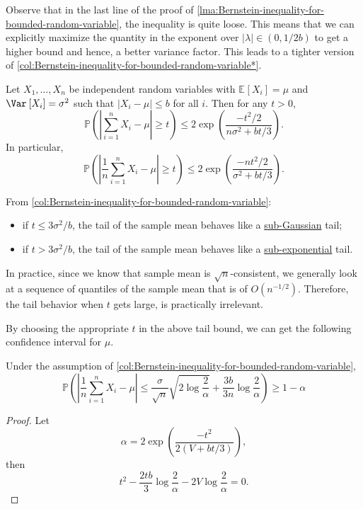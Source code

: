 \begin{remark}
	Observe that in the last line of the proof of \autoref{lma:Bernstein-inequality-for-bounded-random-variable}, the inequality is quite loose. This means that we can explicitly maximize the quantity in the exponent over \(\vert \lambda \vert \in (0 , 1 / 2b)\) to get a higher bound and hence, a better variance factor. This leads to a tighter version of \autoref{col:Bernstein-inequality-for-bounded-random-variable*}.
\end{remark}

\begin{corollary}\label{col:Bernstein-inequality-for-bounded-random-variable}
	Let \(X_1, \dots , X_n\) be independent random variables with \(\mathbb{E}_{}\left[X_i \right] = \mu \) and \(\Var_{}\left[X_i \right] = \sigma ^{2}\) such that \(\vert X_i - \mu \vert \leq b\) for all \(i\). Then for any \(t > 0\),
	\[
		\mathbb{P} \left( \left\vert \sum_{i=1}^{n} X_i - \mu \right\vert \geq t \right) \leq 2 \exp \left( \frac{- t^2 / 2}{n \sigma ^{2} + bt / 3 } \right) .
	\]
	In particular,
	\[
		\mathbb{P} \left( \left\vert \frac{1}{n}\sum_{i=1}^{n} X_i - \mu \right\vert \geq t \right) \leq 2 \exp \left( \frac{- nt^2 / 2}{\sigma ^{2} + bt / 3} \right).
	\]
\end{corollary}

\begin{note}
	From \autoref{col:Bernstein-inequality-for-bounded-random-variable}:
	\begin{itemize}
		\item if \(t \leq 3 \sigma ^{2} / b\), the tail of the sample mean behaves like a \hyperref[def:sub-Gaussian]{sub-Gaussian} tail;
		\item if \(t > 3\sigma ^{2} / b\), the tail of the sample mean behaves like a \hyperref[def:sub-exponential]{sub-exponential} tail.
	\end{itemize}
\end{note}

\begin{remark}
	In practice, since we know that sample mean is \(\sqrt{n} \)-consistent, we generally look at a sequence of quantiles of the sample mean that is of \(O(n^{-1 / 2})\). Therefore, the tail behavior when \(t\) gets large, is practically irrelevant.
\end{remark}

By choosing the appropriate \(t\) in the above tail bound, we can get the following confidence interval for \(\mu \).

\begin{corollary}\label{col:Bernstein-confidence-interval}
	Under the assumption of \autoref{col:Bernstein-inequality-for-bounded-random-variable},
	\[
		\mathbb{P} \left( \left\vert \frac{1}{n} \sum_{i=1}^{n} X_i - \mu  \right\vert \leq \frac{\sigma}{\sqrt{n} } \sqrt{2 \log \frac{2}{\alpha }} + \frac{3b}{3n} \log \frac{2}{\alpha } \right) \geq 1 - \alpha
	\]
\end{corollary}
\begin{proof}
	Let
	\[
		\alpha = 2 \exp \left( \frac{- t^2}{2(V + bt / 3)} \right),
	\]
	then
	\[
		t^2 - \frac{2tb}{3}\log \frac{2}{\alpha } - 2 V \log \frac{2}{\alpha } = 0.
	\]
\end{proof}

